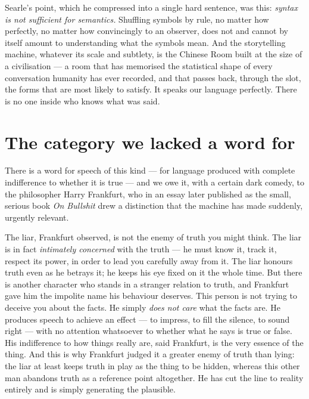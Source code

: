 Searle's point, which he compressed into a single hard sentence, was this: \emph{syntax is not sufficient for semantics.} Shuffling symbols by rule, no matter how perfectly, no matter how convincingly to an observer, does not and cannot by itself amount to understanding what the symbols mean. And the storytelling machine, whatever its scale and subtlety, is the Chinese Room built at the size of a civilisation — a room that has memorised the statistical shape of every conversation humanity has ever recorded, and that passes back, through the slot, the forms that are most likely to satisfy. It speaks our language perfectly. There is no one inside who knows what was said.

\section*{The category we lacked a word for}

There is a word for speech of this kind — for language produced with complete indifference to whether it is true — and we owe it, with a certain dark comedy, to the philosopher Harry Frankfurt, who in an essay later published as the small, serious book \emph{On Bullshit} drew a distinction that the machine has made suddenly, urgently relevant.

The liar, Frankfurt observed, is not the enemy of truth you might think. The liar is in fact \emph{intimately concerned} with the truth — he must know it, track it, respect its power, in order to lead you carefully away from it. The liar honours truth even as he betrays it; he keeps his eye fixed on it the whole time. But there is another character who stands in a stranger relation to truth, and Frankfurt gave him the impolite name his behaviour deserves. This person is not trying to deceive you about the facts. He simply \emph{does not care} what the facts are. He produces speech to achieve an effect — to impress, to fill the silence, to sound right — with no attention whatsoever to whether what he says is true or false. His indifference to how things really are, said Frankfurt, is the very essence of the thing. And this is why Frankfurt judged it a greater enemy of truth than lying: the liar at least keeps truth in play as the thing to be hidden, whereas this other man abandons truth as a reference point altogether. He has cut the line to reality entirely and is simply generating the plausible.

